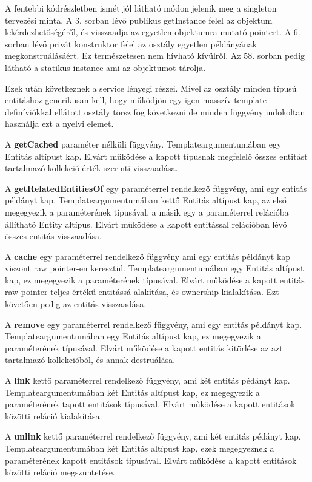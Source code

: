 A fentebbi kódrészletben ismét jól látható módon jelenik meg a singleton tervezési minta. A 3. sorban lévő publikus getInstance felel az objektum lekérdezhetőségéről, és visszaadja az egyetlen objektumra mutató pointert. A 6. sorban lévő privát konstruktor felel az osztály egyetlen példányának megkonstruálásáért. Ez természetesen nem hívható kívülről. Az 58. sorban pedig látható a statikus instance ami az objektumot tárolja.

Ezek után következnek a service lényegi részei. Mivel az osztály minden típusú entitáshoz generikusan kell, hogy működjön egy igen masszív template definíviókkal ellátott osztály törsz fog következni de minden függvény indokoltan használja ezt a nyelvi elemet.

A \textbf{getCached} paraméter nélküli függvény. Templateargumentumában egy Entitás altípust kap. Elvárt működése a kapott típusnak megfelelő összes entitást tartalmazó kollekció érték szerinti visszaadása.

A \textbf{getRelatedEntitiesOf} egy paraméterrel rendelkező függvény, ami egy entitás példányt kap. Templateargumentumában kettő Entitás altípust kap, az első megegyezik a paraméterének típusával, a másik egy a paraméterrel relációba állítható Entity altípus. Elvárt működése a kapott entitással relációban lévő összes entitás visszaadása.

A \textbf{cache} egy paraméterrel rendelkező függvény ami egy entitás példányt kap viszont raw pointer-en keresztül. Templateargumentumában egy Entitás altípust kap, ez megegyezik a paraméterének típusával. Elvárt működése a kapott entitás raw pointer teljes értékű entitássá alakítása, és ownership kialakítása. Ezt követően pedig az entitás visszaadása.

A \textbf{remove} egy paraméterrel rendelkező függvény, ami egy entitás példányt kap. Templateargumentumában egy Entitás altípust kap, ez megegyezik a paraméterének típusával. Elvárt működése a kapott entitás kitörlése az azt tartalmazó kollekcióból, és annak destruálása.

A \textbf{link} kettő paraméterrel rendelkező függvény, ami két entitás pédányt kap. Templateargumentumában két Entitás altípust kap, ez megegyezik a paraméterének tapott entitások típusával. Elvárt működése a kapott entitások közötti reláció kialakítása.

A \textbf{unlink} kettő paraméterrel rendelkező függvény, ami két entitás pédányt kap. Templateargumentumában két Entitás altípust kap, ezek megegyeznek a paraméterének kapott entitások típusával. Elvárt működése a kapott entitások közötti reláció megszüntetése.

